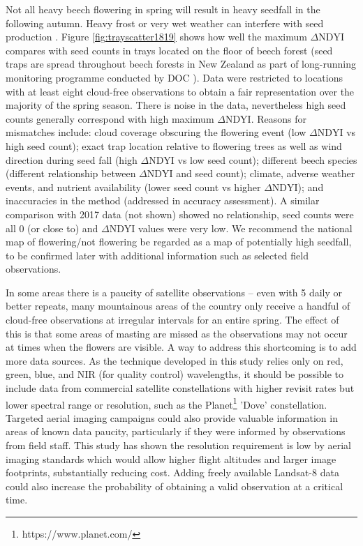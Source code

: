 \documentclass[remotesensing,article,submit,moreauthors,pdftex]{Definitions/mdpi}
\begin{document}
Not all heavy beech flowering in spring will result in heavy seedfall in the following autumn. Heavy frost or very wet weather can interfere with seed production \citep{Wardle1984}.  Figure \ref{fig:trayscatter1819} shows how well the maximum $\Delta\text{NDYI}$ compares with seed counts in trays located on the floor of beech forest (seed traps are spread throughout beech forests in New Zealand as part of long-running monitoring programme conducted by DOC \citep{Elliott2016}). Data were restricted to locations with at least eight cloud-free observations to obtain a fair representation over the majority of the spring season. There is noise in the data, nevertheless high seed counts generally correspond with high maximum $\Delta\text{NDYI}$. Reasons for mismatches include: cloud coverage obscuring the flowering event (low $\Delta\text{NDYI}$ vs high seed count); exact trap location relative to flowering trees as well as wind direction during seed fall (high $\Delta\text{NDYI}$ vs low seed count); different beech species (different relationship between $\Delta\text{NDYI}$ and seed count); climate, adverse weather events, and nutrient availability (lower seed count vs higher $\Delta\text{NDYI}$); and inaccuracies in the method (addressed in accuracy assessment). A similar comparison with 2017 data (not shown) showed no relationship, seed counts were all 0 (or close to) and $\Delta\text{NDYI}$ values were very low. We recommend the national map of flowering/not flowering be regarded as a map of potentially high seedfall, to be confirmed later with additional information such as selected field observations. 

In some areas there is a paucity of satellite observations
-- even with 5 daily or better repeats, many mountainous areas of the country only receive a handful of cloud-free
observations at irregular intervals for an entire spring. The effect of this is that some areas of masting are missed
as the observations may not occur at times when the flowers are visible. A way to address this
shortcoming is to add more data sources. As the technique developed in this study relies only on red, green, blue, and NIR (for quality control)
wavelengths, it should be possible to include data from commercial satellite constellations with higher revisit rates
but lower spectral range or resolution, such as the Planet\footnote{https://www.planet.com/} 'Dove' constellation. Targeted aerial imaging campaigns could also provide valuable information in areas of known data paucity, particularly if they were informed by observations from field staff. This study has shown the resolution requirement is low by aerial imaging standards which would allow higher flight altitudes and larger image footprints, substantially reducing cost. Adding freely available Landsat-8 data could also increase the
probability of obtaining a valid observation at a critical time. 
\end{document}
